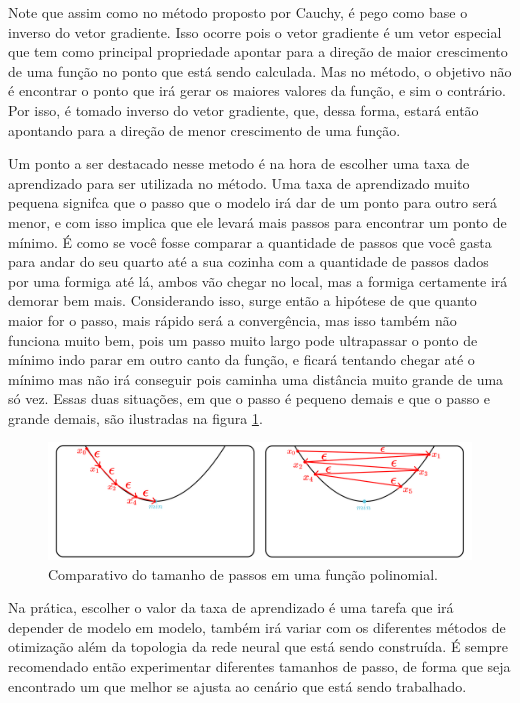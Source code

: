 Note que assim como no método proposto por Cauchy, é pego como base o inverso do vetor gradiente. Isso ocorre pois o vetor gradiente é um vetor especial que tem como principal propriedade apontar para a direção de maior crescimento de uma função no ponto que está sendo calculada. Mas no método, o objetivo não é encontrar o ponto que irá gerar os maiores valores da função, e sim o contrário. Por isso, é tomado inverso do vetor gradiente, que, dessa forma, estará então apontando para a direção de menor crescimento de uma função.

Um ponto a ser destacado nesse metodo é na hora de escolher uma taxa de aprendizado para ser utilizada no método. Uma taxa de aprendizado muito pequena signifca que o passo que o modelo irá dar de um ponto para outro será menor, e com isso implica que ele levará mais passos para encontrar um ponto de mínimo. É como se você fosse comparar a quantidade de passos que você gasta para andar do seu quarto até a sua cozinha com a quantidade de passos dados por uma formiga até lá, ambos vão chegar no local, mas a formiga certamente irá demorar bem mais. Considerando isso, surge então a hipótese de que quanto maior for o passo, mais rápido será a convergência, mas isso também não funciona muito bem, pois um passo muito largo pode ultrapassar o ponto de mínimo indo parar em outro canto da função, e ficará tentando chegar até o mínimo mas não irá conseguir pois caminha uma distância muito grande de uma só vez. Essas duas situações, em que o passo é pequeno demais e que o passo e grande demais, são ilustradas na figura \ref{fig:comparativo-tamanho-do-passo}.

\begin{figure}[h!]
    \centering
    \includegraphics[width=1\linewidth]{../imagens/retropropagacao-gradiente/comparativo-de-passos.png}
    \caption{Comparativo do tamanho de passos em uma função polinomial.}
    \label{fig:comparativo-tamanho-do-passo}
\end{figure}

Na prática, escolher o valor da taxa de aprendizado é uma tarefa que irá depender de modelo em modelo, também irá variar com os diferentes métodos de otimização além da topologia da rede neural que está sendo construída. É sempre recomendado então experimentar diferentes tamanhos de passo, de forma que seja encontrado um que melhor se ajusta ao cenário que está sendo trabalhado.

